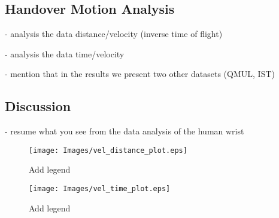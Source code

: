 \subsection{Handover Motion Analysis}

- analysis the data distance/velocity (inverse time of flight)

- analysis the data time/velocity

- mention that in the results we present two other datasets (QMUL, IST)

\subsection{Discussion}

- resume what you see from the data analysis of the human wrist

    \begin{figure}[t]
      \centering
      \texttt{[image: Images/vel\_distance\_plot.eps]}
      \caption{Add legend} 
      \label{fig:vel_distance}
	\end{figure}
	
	
    \begin{figure}[t]
      \centering
      \texttt{[image: Images/vel\_time\_plot.eps]}
      \caption{Add legend} 
      \label{fig:vel_time}
	\end{figure}
	